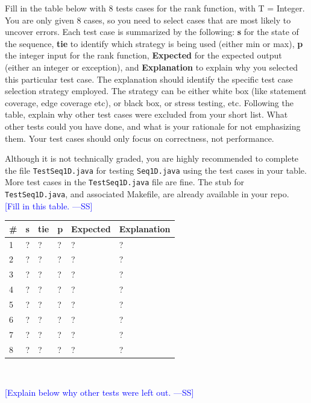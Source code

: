 \documentclass[12pt,fleqn]{examtst}
\newcommand{\authornote}[3]{\textcolor{#1}{[#3 ---#2]}}
\newcommand{\authornote}[3]{}
\newcommand{\wss}[1]{\authornote{blue}{SS}{#1}}
\begin{document}
\noindent
\begin{minipage}{\textwidth}
 \label{Q_TestTable}

Fill in the table below with 8 tests cases for the rank function, with T =
Integer.  You are only given 8 cases, so you need to select cases that are most
likely to uncover errors.  Each test case is summarized by the following:
\textbf{s} for the state of the sequence, \textbf{tie} to identify which
strategy is being used (either min or max), \textbf{p} the integer input for the
rank function, \textbf{Expected} for the expected output (either an integer or
exception), and \textbf{Explanation} to explain why you selected this particular
test case.  The explanation should identify the specific test case selection
strategy employed.  The strategy can be either white box (like statement
coverage, edge coverage etc), or black box, or stress testing, etc.  Following
the table, explain why other test cases were excluded from your short list.  What
other tests could you have done, and what is your rationale for not emphasizing
them.  Your test cases should only focus on correctness, not performance.

Although it is not technically graded, you are highly recommended to complete
the file \texttt{TestSeq1D.java} for testing \texttt{Seq1D.java} using the test
cases in your table.  More test cases in the \texttt{TestSeq1D.java} file are
fine.  The stub for \texttt{TestSeq1D.java}, and associated Makefile, are already available in
your repo.\\

\wss{Fill in this table.}\\

\begin{tabular}{ p{0.75cm}  l  l  l  l p{9cm} }
  \toprule
  \textbf{\#} & \textbf{s} & \textbf{tie} & \textbf{p} & \textbf{Expected} & \textbf{Explanation}\\
  \midrule
  1 & ? & ? & ? & ? & ?\\
  2 & ? & ? & ? & ? & ?\\
  3 & ? & ? & ? & ? & ?\\
  4 & ? & ? & ? & ? & ?\\
  5 & ? & ? & ? & ? & ?\\
  6 & ? & ? & ? & ? & ?\\
  7 & ? & ? & ? & ? & ?\\
  8 & ? & ? & ? & ? & ?\\
  \bottomrule
\end{tabular}\\
\medskip

\wss{Explain below why other tests were left out.}\\

\end{minipage}
\end{document}
